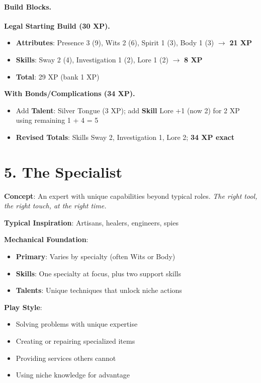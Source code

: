 \begin{multicols}{2}
\paragraph{Build Blocks.}
\textbf{Legal Starting Build (30 XP).}
\begin{itemize}
\item \textbf{Attributes}: Presence 3 (9), Wits 2 (6), Spirit 1 (3), Body 1 (3) $\rightarrow$ \textbf{21 XP}
\item \textbf{Skills}: Sway 2 (4), Investigation 1 (2), Lore 1 (2) $\rightarrow$ \textbf{8 XP}
\item \textbf{Total}: 29 XP (bank 1 XP)
\end{itemize}
\textbf{With Bonds/Complications (34 XP).}
\begin{itemize}
\item Add \textbf{Talent}: Silver Tongue (3 XP); add \textbf{Skill} Lore +1 (now 2) for 2 XP using remaining 1 + 4 = 5
\item \textbf{Revised Totals}: Skills Sway 2, Investigation 1, Lore 2; \textbf{34 XP exact}
\end{itemize}

\section{5. The Specialist}

\textbf{Concept}: An expert with unique capabilities beyond typical roles. \emph{The right tool, the right touch, at the right time.}

\textbf{Typical Inspiration}: Artisans, healers, engineers, spies

\textbf{Mechanical Foundation}:
\begin{itemize}
\item \textbf{Primary}: Varies by specialty (often Wits or Body)
\item \textbf{Skills}: One specialty at focus, plus two support skills
\item \textbf{Talents}: Unique techniques that unlock niche actions
\end{itemize}

\textbf{Play Style}:
\begin{itemize}
\item Solving problems with unique expertise
\item Creating or repairing specialized items
\item Providing services others cannot
\item Using niche knowledge for advantage
\end{itemize}


\end{multicols}
